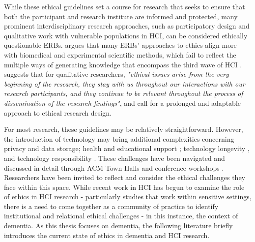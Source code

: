 While these ethical guidelines set a course for research that seeks to ensure that both the participant and research institute are informed and protected, many prominent interdisciplinary research approaches, such as participatory design and qualitative work with vulnerable populations in HCI, can be considered ethically questionable ERBs. \cite{bell_censorship_2014} argues that many ERBs’ approaches to ethics align more with biomedical and experimental scientific methods, which fail to reflect the multiple ways of generating knowledge that encompass the third wave of HCI \citep{bodker_when_2006,lazar_critical_2017}. \cite{carla_introducing_2013} suggests that for qualitative researchers,\textit{ "ethical issues arise from the very beginning of the research, they stay with us throughout our interactions with our research participants, and they continue to be relevant throughout the process of dissemination of the research findings"}, and call for a prolonged and adaptable approach to ethical research design. 

For most research, these guidelines may be relatively straightforward. However, the introduction of technology may bring additional complexities concerning privacy and data storage; health and educational support \citep{gray2016inscribing}; technology longevity \citep{foley_printer_2019}, and technology responsibility \citep{ferrario_software_2014}. These challenges have been navigated and discussed in detail through ACM Town Halls and conference workshops \citep{frauenberger_research_2017,munteanu_sigchi_2019,waycott_ethical_2015}. Researchers have been invited to reflect and consider the ethical challenges they face within this space. While recent work in HCI has begun to examine the role of ethics in HCI research - particularly studies that work within sensitive settings, there is a need to come together as a community of practice to identify institutional and relational ethical challenges - in this instance, the context of dementia. As this thesis focuses on dementia, the following literature briefly introduces the current state of ethics in dementia and HCI research.

